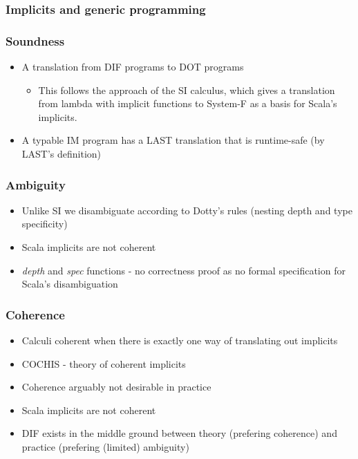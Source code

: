 \begin{frame}
    \frametitle{Implicits and generic programming}
    \TODOTHIS
\end{frame}

\begin{frame}
    \frametitle{Soundness}
    \begin{itemize}
        \pause
        \item A translation from DIF programs to DOT programs
        \pause
        \begin{itemize}
            \item This follows the approach of the SI calculus, which gives a
                translation from lambda with implicit functions to System-F as
                a basis for Scala's implicits.
        \end{itemize}
        \pause
        \item A typable IM program has a LAST translation that is runtime-safe
            (by LAST's definition)
    \end{itemize}
\end{frame}

\begin{frame}
    \frametitle{Ambiguity} \TODOTHIS
    \begin{itemize}
        \item Unlike SI we disambiguate according to Dotty's rules (nesting
            depth and type specificity)
        \item Scala implicits are not coherent
        \item \emph{depth} and \emph{spec} functions - no correctness proof as
            no formal specification for Scala's disambiguation
    \end{itemize}
\end{frame}

\begin{frame}
    \frametitle{Coherence} \TODOTHIS
    \begin{itemize}
        \item Calculi coherent when there is exactly one way of translating out
            implicits
        \item COCHIS - theory of coherent implicits 
        \item Coherence arguably not desirable in practice
        \item Scala implicits are not coherent
        \item DIF exists in the middle ground between theory (prefering
            coherence) and practice (prefering (limited) ambiguity)
    \end{itemize}
\end{frame}

\begin{frame}
\end{frame}
